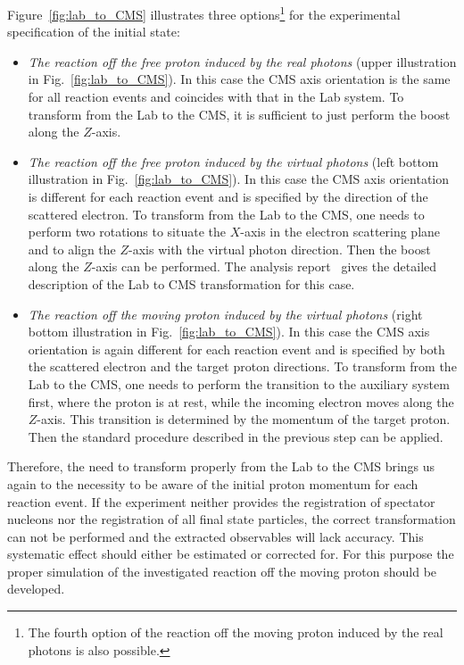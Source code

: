 Figure~\ref{fig:lab_to_CMS} illustrates three options\footnote[5]{The fourth option of the reaction off the moving proton induced by the real photons is also possible.} for the experimental specification of the initial state:

\begin{itemize}
\item \textit{The reaction off the free proton induced by the real photons} (upper illustration in Fig.~\ref{fig:lab_to_CMS}). In this case the CMS axis orientation is the same for all reaction events and coincides with that in the Lab system. To transform from the Lab to the CMS, it is sufficient to just perform the boost along the $Z$-axis.%
\item \textit{The reaction off the free proton induced by the virtual photons} (left bottom illustration in Fig.~\ref{fig:lab_to_CMS}). In this case the CMS axis orientation is different for each reaction event and is specified by the direction of the scattered electron. To transform from the Lab to the CMS, one needs to perform two rotations to situate the $X$-axis in the electron scattering plane and to align the $Z$-axis with the virtual photon direction. Then the boost along the $Z$-axis can be performed. The analysis report~\cite{Fed_an_note:2017} gives the detailed description of the Lab to CMS transformation for this case.
\item \textit{The reaction off the moving proton induced by the virtual photons} (right bottom illustration in Fig.~\ref{fig:lab_to_CMS}). In this case the CMS axis orientation is again different for each reaction event and is specified by both the scattered electron and the target proton directions. To transform from the Lab to the CMS, one needs to perform the transition to the auxiliary system first, where the proton is at rest, while the incoming electron moves along the $Z$-axis. This transition is determined by the momentum of the target proton. Then the standard procedure described in the previous step can be applied.  
\end{itemize} 


Therefore, the need to transform properly from the Lab to the CMS brings us again to the necessity to be aware of the initial proton momentum for each reaction event. If the experiment neither provides the registration of spectator nucleons nor the registration of all final state particles, the correct transformation can not be performed and the extracted observables will lack accuracy. This systematic effect should either be estimated or corrected for. For this purpose the proper simulation of the investigated reaction off the moving proton should be developed.




